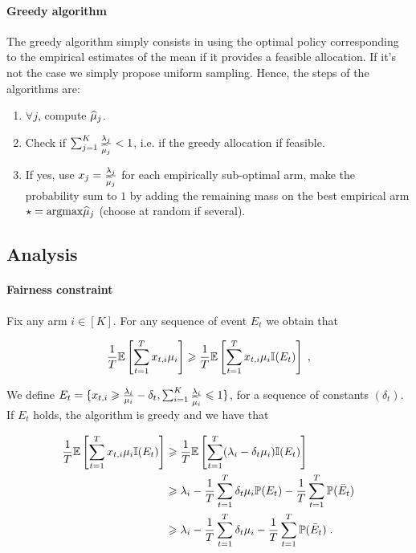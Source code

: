 \paragraph{Greedy algorithm} The greedy algorithm simply consists in using the optimal policy corresponding to the empirical estimates of the mean if it provides a feasible allocation. If it's not the case we simply propose uniform sampling. Hence, the steps of the algorithms are: 
\begin{enumerate}
	\item $\forall j$, compute $\widehat{\mu}_j$.
	\item Check if $\sum_{j=1}^K \frac{\lambda_j}{\widehat{\mu}_j}<1$, i.e. if the greedy allocation if feasible.
	\item If yes, use $x_j=\frac{\lambda_j}{\widehat{\mu}_j}$ for each empirically sub-optimal arm, make the probability sum to $1$ by adding the remaining mass on the best empirical arm $\star = \text{argmax} \widehat{\mu}_j$ (choose at random if several).
\end{enumerate}


\subsection{Analysis}

\paragraph{Fairness constraint} Fix any arm $i \in [K]$. For any sequence of event $E_t$ we obtain that 

\begin{align*} 
\frac{1}{T} \mathbb{E}\left[\sum_{t=1}^T x_{t,i} \mu_i \right] \geqslant 
\frac{1}{T} \mathbb{E}\left[\sum_{t=1}^T x_{t,i} \mu_i \mathbb{I}(E_t) \right]\;,
\end{align*}

We define $E_t = \{x_{t,i} \geqslant \frac{\lambda_i}{\mu_i}-\delta_t, \sum_{i=1}^K \frac{\lambda_i}{\widehat{\mu}_i}\leqslant 1 \}$, for a sequence of constants $(\delta_t)$. If $E_t$ holds, the algorithm is greedy and we have that 

\begin{align*}  
\frac{1}{T} \mathbb{E}\left[\sum_{t=1}^T x_{t,i} \mu_i \mathbb{I}(E_t) \right] &\geqslant \frac{1}{T} \mathbb{E}\left[\sum_{t=1}^T (\lambda_i - \delta_t \mu_i) \mathbb{I}(E_t) \right] \\
& \geqslant  \lambda_i - \frac{1}{T} \sum_{t=1}^T \delta_t \mu_i \mathbb{P}(E_t) - \frac{1}{T} \sum_{t=1}^T \mathbb{P}(\bar E_t) \\
& \geqslant  \lambda_i - \frac{1}{T} \sum_{t=1}^T \delta_t \mu_i - \frac{1}{T} \sum_{t=1}^T  \mathbb{P}(\bar E_t)\;.
\end{align*}

